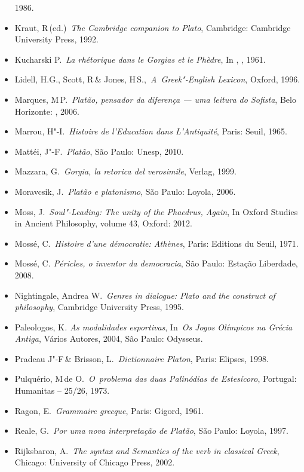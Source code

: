 \begin{itemize}
  1986.
\item
  Kraut, R\,(ed.)~\emph{The Cambridge companion to Plato}, Cambridge:
  Cambridge University Press, 1992.
\item
  Kucharski P.~\emph{La rhétorique dans le Gorgias et le Phèdre}, In
  , , 1961.
\item
  Lidell, H.G., Scott, R\,\& Jones, H\,S.,~\emph{A~Greek"-English
  Lexicon}, Oxford, 1996.
\item
  Marques, M\,P.~\emph{Platão, pensador da diferença --- uma leitura do
  Sofista}, Belo Horizonte: , 2006.
\item
  Marrou, H"-I.~\emph{Histoire de l'Education dans L'Antiquité}, Paris:
  Seuil, 1965.
\item
  Mattéi, J"-F.~\emph{Platão}, São Paulo: Unesp, 2010.
\item
  Mazzara, G.~\emph{Gorgia, la retorica del verosimile}, Verlag, 1999.
\item
  Moravcsik, J.~\emph{Platão e platonismo}, São Paulo: Loyola, 2006.
\item
  Moss, J.~\emph{Soul"-Leading: The unity of the Phaedrus, Again}, In
  Oxford Studies in Ancient Philosophy, volume 43, Oxford: 2012.
\item
  Mossé, C.~\emph{Histoire d'une démocratie: Athènes}, Paris: Editions
  du Seuil, 1971.
\item
  Mossé, C\emph{. Péricles, o inventor da democracia}, São Paulo:
  Estação Liberdade, 2008.
\item
  Nightingale, Andrea W.~\emph{Genres in dialogue: Plato and the
  construct of philosophy}, Cambridge University Press, 1995.
\item
  Paleologos, K\emph{. As modalidades esportivas}, In~\emph{Os Jogos
  Olímpicos na Grécia Antiga}, Vários Autores, 2004, São Paulo:
  Odysseus.
\item
  Pradeau J"-F\,\& Brisson, L.~\emph{Dictionnaire Platon}, Paris:
  Elipses, 1998.
\item
  Pulquério, M\,de O.~\emph{O~problema das duas Palinódias de
  Estesícoro}, Portugal: Humanitas -- 25/\allowbreak{}26, 1973.
\item
  Ragon, E.~\emph{Grammaire grecque}, Paris: Gigord, 1961.
\item
  Reale, G.~\emph{Por uma nova interpretação de Platão}, São Paulo:
  Loyola, 1997.
\item
  Rijksbaron, A.~\emph{The syntax and Semantics of the verb in classical
  Greek}, Chicago: University of Chicago Press, 2002.

\end{itemize}
